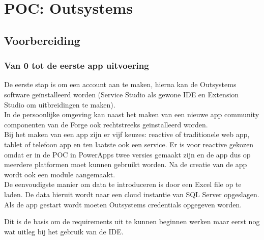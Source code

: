 
\chapter{POC: Outsystems}
\label{ch:outsystems-poc}



\section{Voorbereiding}

\subsection{Van 0 tot de eerste app uitvoering}

De eerste stap is om een account aan te maken, hierna kan de Outsystems software geïnstalleerd worden (Service Studio als gewone IDE en Extension Studio om uitbreidingen te maken).\\
In de persoonlijke omgeving kan naast het maken van een nieuwe app community componenten van de Forge ook rechtstreeks geïnstalleerd worden. \\
Bij het maken van een app zijn er vijf keuzes: reactive of traditionele web app, tablet of telefoon app en ten laatste ook een service. Er is voor reactive gekozen omdat er in de POC in PowerApps twee versies gemaakt zijn en de app dus op meerdere platformen moet kunnen gebruikt worden. Na de creatie van de app wordt ook een module aangemaakt.\\
De eenvoudigste manier om data te introduceren is door een Excel file op te laden. De data hieruit wordt naar een cloud instantie van SQL Server opgeslagen.\\
Als de app gestart wordt moeten Outsystems credentials opgegeven worden.

Dit is de basis om de requirements uit te kunnen beginnen werken maar eerst nog wat uitleg bij het gebruik van de IDE.

